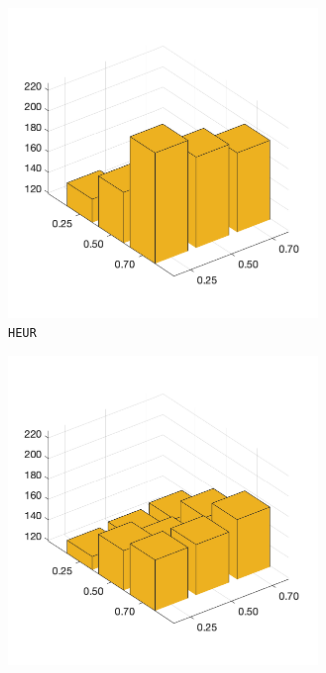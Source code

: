 \begin{figure}[H]
\begin{subfigure}[b]{0.25\textwidth}
    	\end{subfigure}
%
	\begin{subfigure}[b]{0.25\textwidth}
		\centering
		\includegraphics[width=0.9\textwidth]{crossover/min/cross_heuristic_3.png}
		\caption{\texttt{HEUR}}
		\label{fig:x}
    	\end{subfigure}
%
	\begin{subfigure}[b]{0.25\textwidth}
		\centering
		\includegraphics[width=0.9\textwidth]{crossover/min/cross_max_preservative_3.png}

\end{subfigure}
\end{figure}
